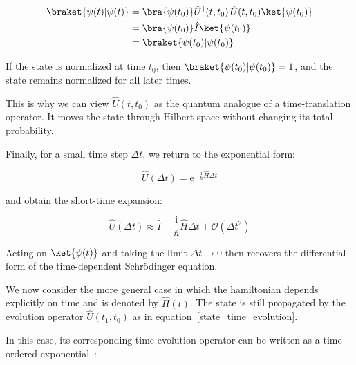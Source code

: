 \begin{equation}
\begin{aligned}
    \braket{\psi(t)|\psi(t)}
    &= \bra{\psi(t_0)}\hat{U}^{\dagger}(t,t_0)\,\hat{U}(t,t_0)\ket{\psi(t_0)} \\
    &= \bra{\psi(t_0)}\hat{I}\ket{\psi(t_0)} \\
    &= \braket{\psi(t_0)|\psi(t_0)}
\end{aligned}
\label{time_evolution_norm_conservation}
\end{equation}

If the state is normalized at time $t_0$, then $\braket{\psi(t_0)|\psi(t_0)}=1$, and the state remains normalized for all later times.

This is why we can view $\hat{U}(t,t_0)$ as the quantum analogue of a time-translation operator.
It moves the state through Hilbert space without changing its total probability.

Finally, for a small time step $\Delta t$, we return to the exponential form:

\begin{equation}
    \hat{U}(\Delta t)=\mathrm{e}^{-\frac{\mathrm{i}}{\hbar}\hat{H}\Delta t}
\label{time_evolution_short_time_exact}
\end{equation}

and obtain the short-time expansion:

\begin{equation}
    \hat{U}(\Delta t)\approx \hat{I}-\frac{\mathrm{i}}{\hbar}\hat{H}\Delta t+\mathcal{O}(\Delta t^2)
\label{time_evolution_short_time_series}
\end{equation}

Acting on $\ket{\psi(t)}$ and taking the limit $\Delta t\to 0$ then recovers the differential form of the time-dependent Schrödinger equation.


We now consider the more general case in which the hamiltonian depends explicitly on time and is denoted by $\hat{H}(t)$.
The state is still propagated by the evolution operator $\hat{U}(t_1,t_0)$ as in equation~\eqref{state_time_evolution}.

In this case, its corresponding time-evolution operator can be written as a time-ordered exponential~\cite{sakurai2020modern}:

